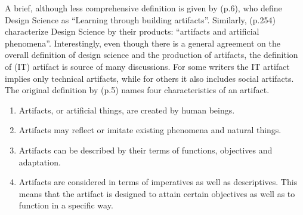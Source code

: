 A brief, although less comprehensive definition is given by \cite{VaishnaviDesignScienceResearch} (p.6), who define Design Science as \enquote{Learning through building artifacts}. Similarly, \cite{MarchDesignnaturalscience1995} (p.254) characterize Design Science by their products: \enquote{artifacts and artificial phenomena}. Interestingly, even though there is a general agreement on the overall definition of design science and the production of artifacts, the definition of (IT) artifact is source of many discussions. For some writers the IT artifact implies only technical artifacts, while for others it also includes social artifacts.
The original definition by \cite{Simonsciencesartificial1996} (p.5) names four characteristics of an artifact.
\begin{enumerate}
    \item Artifacts, or artificial things, are created by human beings.
    \item Artifacts may reflect or imitate existing phenomena and natural things.
    \item Artifacts can be described by their terms of functions, objectives and adaptation.
    \item Artifacts are considered in terms of imperatives as well as descriptives. This means that the artifact is designed to attain certain objectives as well as to function in a specific way.  
\end{enumerate}

